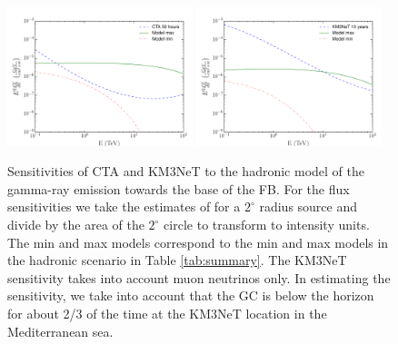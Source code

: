 \begin{figure}[h]
\centering
 \includegraphics[width=0.48\textwidth]{plots/low_lat_FB_CTA.pdf}
 \includegraphics[width=0.48\textwidth]{plots/low_lat_FB_KM3.pdf}
 \caption{Sensitivities of CTA and KM3NeT to the hadronic model of the gamma-ray emission towards the base of the FB.
 For the flux sensitivities we take the estimates of \cite{2018APh...100...69A} for a $2^\circ$ radius source and divide by the
 area of the $2^\circ$ circle to transform to intensity units. The min and max models correspond to the min and max models in
 the hadronic scenario in Table \ref{tab:summary}. The KM3NeT sensitivity takes into account muon neutrinos only.
 In estimating the sensitivity, we take into account that the GC is below the horizon for about 2/3 of the time
 at the KM3NeT location in the Mediterranean sea.
 }
 \label{fig:sensitivities}
\end{figure}


